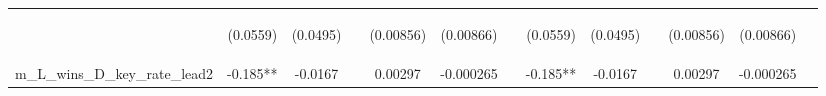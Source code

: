 \documentclass[]{article}
\begin{document}
\begin{center}
\begin{tabular}{lcccccccccccc}
\vspace{4pt} & \begin{footnotesize}(0.0559)\end{footnotesize} & \begin{footnotesize}(0.0495)\end{footnotesize} & \begin{footnotesize}\end{footnotesize} & \begin{footnotesize}(0.00856)\end{footnotesize} & \begin{footnotesize}(0.00866)\end{footnotesize} & \begin{footnotesize}\end{footnotesize} & \begin{footnotesize}(0.0559)\end{footnotesize} & \begin{footnotesize}(0.0495)\end{footnotesize} & \begin{footnotesize}\end{footnotesize} & \begin{footnotesize}(0.00856)\end{footnotesize} & \begin{footnotesize}(0.00866)\end{footnotesize} & \begin{footnotesize}\end{footnotesize} \\
m\_L\_wins\_D\_key\_rate\_lead2 & -0.185** & -0.0167 &  & 0.00297 & -0.000265 &  & -0.185** & -0.0167 &  & 0.00297 & -0.000265 &  \\

\end{tabular}
\end{center}
\end{document}
